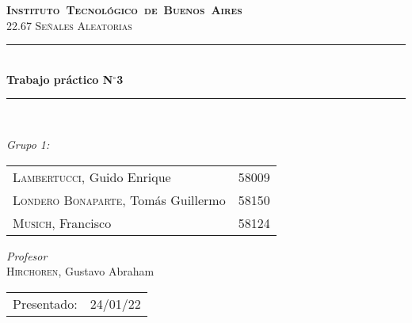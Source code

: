 \begin{titlepage}
\newcommand{\HRule}{\rule{\linewidth}{0.5mm}}
\center
\mbox{\textsc{\LARGE \bfseries {Instituto Tecnológico de Buenos Aires}}}\\[1.5cm]
\textsc{\Large 22.67 Señales Aleatorias}\\[0.5cm]


\HRule \\[0.6cm]
{ \Huge \bfseries Trabajo práctico N$^{\circ}$3}\\[0.4cm] 
\HRule \\[1.5cm]


{\large

\emph{Grupo 1:}\\
\vspace{3pt}

\begin{tabular}{lr} 	
\textsc{Lambertucci}, Guido Enrique  & 58009 \\
\textsc{Londero Bonaparte}, Tomás Guillermo  & 58150 \\
\textsc{Musich}, Francisco  & 58124\\
\end{tabular}

\vspace{20pt}

\emph{Profesor}\\
\textsc{Hirchoren}, Gustavo Abraham \\
\vspace{3pt}

\vspace{100pt}

\begin{tabular}{ll}

Presentado: & 24/01/22\\

\end{tabular}

}

\vfill

\end{titlepage}
